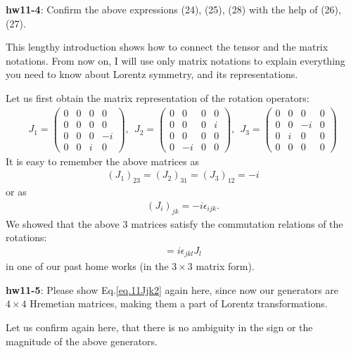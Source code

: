 \documentclass[12pt]{article}
\begin{document}
{\bf hw11-4}: Confirm the above expressions (24), (25), (28) with the
  help of (26), (27).

  This lengthy introduction shows how to connect the tensor and the
  matrix notations.  From now on, I will use only matrix notations
  to explain everything you need to know about Lorentz symmetry,
  and its representations.

  Let us first obtain the matrix representation of the rotation operators:
\begin{eqnarray}
  J_1 = 
  \begin{pmatrix}
    0 & 0 & 0 & 0\\
    0 & 0 & 0 & 0 \\
    0 & 0 & 0 & -i \\
    0 & 0 & i & 0
  \end{pmatrix}
  ,~~ J_2 =
  \begin{pmatrix}
    0 & 0 & 0 & 0 \\
    0 & 0 & 0 & i \\
    0 & 0 & 0 & 0 \\
    0 & -i & 0 & 0 
  \end{pmatrix}
  ,~~J_3=
  \begin{pmatrix}
    0 & 0 & 0 & 0 \\
    0 & 0 & -i & 0 \\
    0 & i & 0 & 0 \\
    0 & 0 & 0 & 0 
  \end{pmatrix}
\end{eqnarray}
  It is easy to remember the above matrices as
\begin{eqnarray}
  (J_1)_{23} = (J_2)_{31} = (J_3)_{12} = -i
\end{eqnarray}
  or as
\begin{eqnarray}
  (J_i)_{jk} = -i \epsilon_{ijk}. \label{eq.11Jjk}
\end{eqnarray}
We showed that the above 3 matrices satisfy the commutation relations
of the rotations:
\begin{eqnarray}
  [ J_j, J_k ] = i\epsilon_{jkl} J_l \label{eq.11Jjk2}
\end{eqnarray}
 in one of our past home works (in the $3 \times 3$ matrix form).

{\bf hw11-5}: Please show Eq.\ref{eq.11Jjk2} again here, since now our generators are $4 \times 4$
  Hremetian matrices, making them a part of Lorentz transformations.

  Let us confirm again here, that there is no ambiguity in the sign or
  the magnitude of the above generators.
\end{document}
